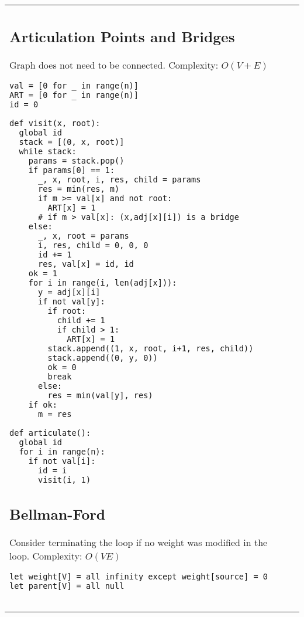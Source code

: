 \documentclass[letterpaper]{article}
\begin{document}
\vspace*{-2em}
\begin{tabular}{@{}p{9cm}p{9cm}@{}}
    \subsection{Articulation Points and Bridges}
    Graph does not need to be connected.
    Complexity: $O\left(V + E\right)$

    \begin{lstlisting}
val = [0 for _ in range(n)]
ART = [0 for _ in range(n)]
id = 0

def visit(x, root):
  global id
  stack = [(0, x, root)]
  while stack:
    params = stack.pop()
    if params[0] == 1:
      _, x, root, i, res, child = params
      res = min(res, m)
      if m >= val[x] and not root:
        ART[x] = 1
      # if m > val[x]: (x,adj[x][i]) is a bridge
    else:
      _, x, root = params
      i, res, child = 0, 0, 0
      id += 1
      res, val[x] = id, id
    ok = 1
    for i in range(i, len(adj[x])):
      y = adj[x][i]
      if not val[y]:
        if root:
          child += 1
          if child > 1:
            ART[x] = 1
        stack.append((1, x, root, i+1, res, child))
        stack.append((0, y, 0))
        ok = 0
        break
      else:
        res = min(val[y], res)
    if ok:
      m = res

def articulate():
  global id
  for i in range(n):
    if not val[i]:
      id = i
      visit(i, 1)
\end{lstlisting}


    \subsection{Bellman-Ford}

    Consider terminating the loop if no weight was modified in the loop. Complexity: $O(VE)$

    \begin{lstlisting}
let weight[V] = all infinity except weight[source] = 0
let parent[V] = all null


\end{lstlisting}
\end{tabular}
\end{document}
